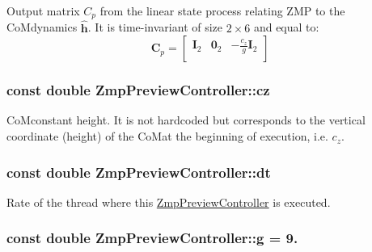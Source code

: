 \-Output matrix $C_p$ from the linear state process relating \-Z\-M\-P to the \-Co\-Mdynamics $\hat{\mathbf{h}}$. \-It is time-\/invariant of size $2\times6$ and equal to\-: \[ \mathbf{C}_p = \left[\begin{array}{ccc} \mathbf{I}_2 & \mathbf{0}_2 & -\frac{c_z}{g}\mathbf{I}_2 \\ \end{array}\right] \] \hypertarget{classZmpPreviewController_a3a317d26cc1bbaf8811491724fdd1def}{
\subsubsection[{cz}]{\setlength{\rightskip}{0pt plus 5cm}const double {\bf \-Zmp\-Preview\-Controller\-::cz}}}\label{classZmpPreviewController_a3a317d26cc1bbaf8811491724fdd1def}
\-Co\-Mconstant height. \-It is not hardcoded but corresponds to the vertical coordinate (height) of the \-Co\-Mat the beginning of execution, i.\-e. $ c_z $. \hypertarget{classZmpPreviewController_abf1a3ec8d1698afab1c20bba32b5a724}{
\subsubsection[{dt}]{\setlength{\rightskip}{0pt plus 5cm}const double {\bf \-Zmp\-Preview\-Controller\-::dt}}}\label{classZmpPreviewController_abf1a3ec8d1698afab1c20bba32b5a724}
\-Rate of the thread where this \hyperlink{classZmpPreviewController}{\-Zmp\-Preview\-Controller} is executed. \hypertarget{classZmpPreviewController_a344571f012aa58250d7625905681bf1b}{
\subsubsection[{g}]{\setlength{\rightskip}{0pt plus 5cm}const double {\bf \-Zmp\-Preview\-Controller\-::g} = 9.}}\label{classZmpPreviewController_a344571f012aa58250d7625905681bf1b}

